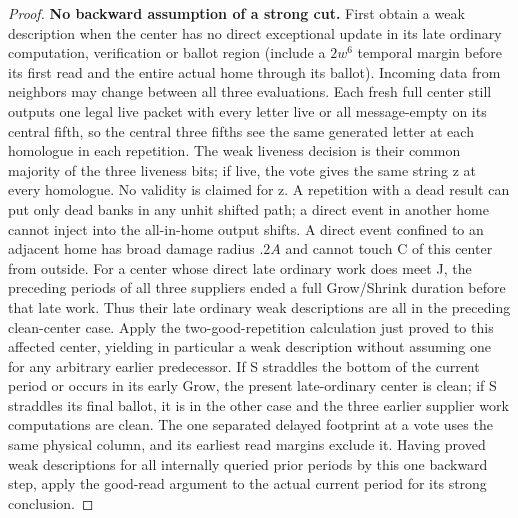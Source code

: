 \begin{proof}
\textbf{No backward assumption of a strong cut.} First obtain a weak description when the center has no direct exceptional update in its late ordinary computation, verification or ballot region (include a \(2w^6\) temporal margin before its first read and the entire actual home through its ballot). Incoming data from neighbors may change between all three evaluations. Each fresh full center still outputs one legal live packet with every letter live or all message-empty on its central fifth, so the central three fifths see the same generated letter at each homologue in each repetition. The weak liveness decision is their common majority of the three liveness bits; if live, the vote gives the same string z at every homologue. No validity is claimed for z. A repetition with a dead result can put only dead banks in any unhit shifted path; a direct event in another home cannot inject into the all-in-home output shifts. A direct event confined to an adjacent home has broad damage radius \(.2A\) and cannot touch C of this center from outside. For a center whose direct late ordinary work does meet J, the preceding periods of all three suppliers ended a full Grow/Shrink duration before that late work. Thus their late ordinary weak descriptions are all in the preceding clean-center case. Apply the two-good-repetition calculation just proved to this affected center, yielding in particular a weak description without assuming one for any arbitrary earlier predecessor. If S straddles the bottom of the current period or occurs in its early Grow, the present late-ordinary center is clean; if S straddles its final ballot, it is in the other case and the three earlier supplier work computations are clean. The one separated delayed footprint at a vote uses the same physical column, and its earliest read margins exclude it. Having proved weak descriptions for all internally queried prior periods by this one backward step, apply the good-read argument to the actual current period for its strong conclusion.


\end{proof}
